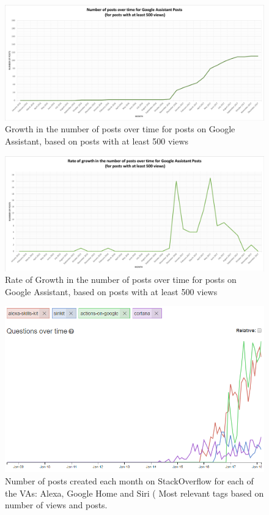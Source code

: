 \documentclass{sigchi}
\begin{document}
\begin{figure}[ht]
	\centering
\includegraphics[width=\textwidth,height=\textheight,keepaspectratio]{RQ6-GoogleNumPostsOverTime_500Views.png}
    \caption{Growth in the number of posts over time for posts on Google Assistant, based on posts with at least 500 views}
    \label{fig:9GAGrowthInNumPosts500Views}
\end{figure}
\begin{figure}[ht]
	\centering
\includegraphics[width=\textwidth,height=\textheight,keepaspectratio]{RQ6-GoogleRateNumPostsOverTime_500Views.png}
    \caption{Rate of Growth in the number of posts over time for posts on Google Assistant, based on posts with at least 500 views}
    \label{fig:9.1GARateGrowthInNumPosts500Views}
\end{figure}

\begin{figure}[ht]
	\centering
\includegraphics[scale=0.7]{RQ6_Tag_Trends_AGS.PNG}
    \caption{Number of posts created each month on StackOverflow for each of the VAs: Alexa, Google Home and Siri ( Most relevant tags based on number of views and posts.}
    \label{fig:11MonthlyPostsforAGSC}
\end{figure}





%


 
\end{document}
